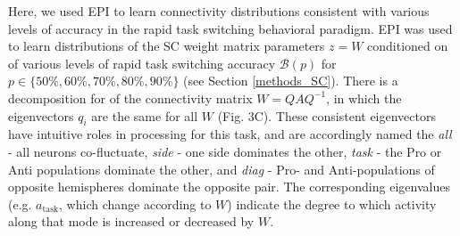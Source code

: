 \documentclass[11pt]{article}
\begin{document}
Here, we used EPI to learn connectivity distributions consistent with various levels of accuracy in the rapid task switching behavioral paradigm.  EPI was used to learn distributions of the SC weight matrix parameters $z = W$ conditioned on of various levels of rapid task switching accuracy $\mathcal{B}(p)$ for $p \in \{50\%, 60\%, 70\%, 80\%, 90\%\}$ (see Section \ref{methods_SC}).  There is a decomposition for of the connectivity matrix $W = QAQ^{-1}$, in which the eigenvectors $q_i$ are the same for all $W$ (Fig. 3C).
These consistent eigenvectors have intuitive roles in processing for this task, and are accordingly named the \textit{all} - all neurons co-fluctuate, \textit{side} - one side dominates the other, \textit{task} - the Pro or Anti populations dominate the other, and \textit{diag} - Pro- and Anti-populations of opposite hemispheres dominate the opposite pair. The corresponding eigenvalues (e.g. $a_{\text{task}}$, which change according to $W$) indicate the degree to which activity along that mode is increased or decreased by $W$.  
\end{document}
